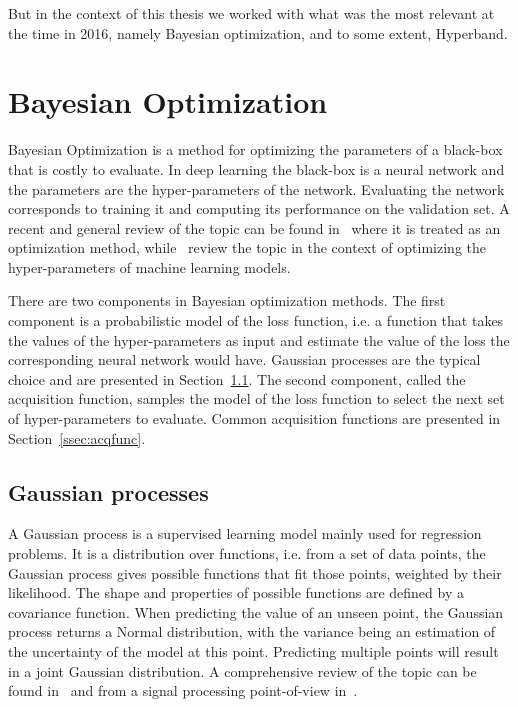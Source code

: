 But in the context of this thesis we worked with what was the most relevant at the time in 2016, namely Bayesian optimization, and to some extent, Hyperband.

\section{Bayesian Optimization}
\label{sec:bo}

Bayesian Optimization is a method for optimizing the parameters of a black-box that is costly to evaluate. In deep learning the black-box is a neural network and the parameters are the hyper-parameters of the network. Evaluating the network corresponds to training it and computing its performance on the validation set. A recent and general review of the topic can be found in~\textcite{shahriari2016IEEE} where it is treated as an optimization method, while~\textcite{snoek2012NIPS} review the topic in the context of optimizing the hyper-parameters of machine learning models.

There are two components in Bayesian optimization methods. The first component is a probabilistic model of the loss function, i.e. a function that takes the values of the hyper-parameters as input and estimate the value of the loss the corresponding neural network would have. Gaussian processes are the typical choice and are presented in Section~\ref{ssec:gp}. 
The second component, called the acquisition function, samples the model of the loss function to select the next set of hyper-parameters to evaluate. Common acquisition functions are presented in Section~\ref{ssec:acqfunc}.

\subsection{Gaussian processes}
\label{ssec:gp}

A Gaussian process is a supervised learning model mainly used for regression problems. It is a distribution over functions, i.e. from a set of data points, the Gaussian process gives possible functions that fit those points, weighted by their likelihood. The shape and properties of possible functions are defined by a covariance function. When predicting the value of an unseen point, the Gaussian process returns a Normal distribution, with the variance being an estimation of the uncertainty of the model at this point. Predicting multiple points will result in a joint Gaussian distribution. A comprehensive review of the topic can be found in~\textcite{rasmussen2005} and from a signal processing point-of-view in~\textcite{perez-cruz2013}.

